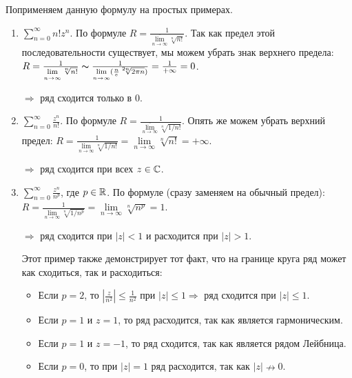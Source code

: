 \vspace*{7mm}
Поприменяем данную формулу на простых примерах.

\begin{examples}
    \begin{enumerate}
        \item $\sum\limits_{n=0}^\infty n!z^n$. 
        По формуле $R = \frac{1}{\overline{\lim\limits_{n \to \infty}} \sqrt[n]{n!}}$. 
        Так как предел этой последовательности существует, мы можем убрать знак верхнего предела: $R = \frac{1}{\lim\limits_{n \to \infty} \sqrt[n]{n!}} \thicksim \frac{1}{\lim\limits_{n \to \infty} (\frac{n}{e}\sqrt[2n]{2\pi n})} = \frac{1}{+\infty} = 0$.
        
        $\Rightarrow$ ряд сходится только в 0.
        \item $\sum\limits_{n=0}^\infty \frac{z^n}{n!}$. 
        По формуле $R = \frac{1}{\overline{\lim\limits_{n \to \infty}} \sqrt[n]{1/n!}}$.
        Опять же можем убрать верхний предел: $R = \frac{1}{\lim\limits_{n \to \infty} \sqrt[n]{1/n!}} = \lim\limits_{n \to \infty} \sqrt[n]{n!} = +\infty$.

        $\Rightarrow$ ряд сходится при всех $z \in \mathbb{C}$.
        \item $\sum\limits_{n=0}^\infty \frac{z^n}{n^p}$, где $p \in \mathbb{R}$.
        По формуле (сразу заменяем на обычный предел): $R = \frac{1}{\lim\limits_{n \to \infty} \sqrt[n]{1/n^p}} = \lim\limits_{n \to \infty} \sqrt[n]{n^p} = 1$.
        
        $\Rightarrow$ ряд сходится при $|z| < 1$ и расходится при $|z| > 1$.

        Этот пример также демонстрирует тот факт, что на границе круга ряд может как сходиться, так и расходиться: \begin{itemize}
            \item Если $p = 2$, то $|\frac{z}{n^2}| \leqslant \frac{1}{n^2}$ при $|z| \leqslant 1 \Rightarrow$ ряд сходится при $|z| \leqslant 1$.
            \item Если $p = 1$ и $z = 1$, то ряд расходится, так как является гармоническим.
            \item Если $p = 1$ и $z = -1$, то ряд сходится, так как является рядом Лейбница.
            \item Если $p = 0$, то при $|z| = 1$ ряд расходится, так как $|z| \nrightarrow 0$.
        \end{itemize}
    \end{enumerate}    
\end{examples}

